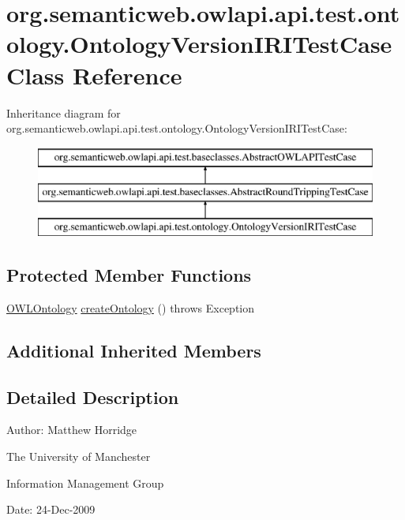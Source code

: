 \hypertarget{classorg_1_1semanticweb_1_1owlapi_1_1api_1_1test_1_1ontology_1_1_ontology_version_i_r_i_test_case}{\section{org.\-semanticweb.\-owlapi.\-api.\-test.\-ontology.\-Ontology\-Version\-I\-R\-I\-Test\-Case Class Reference}
\label{classorg_1_1semanticweb_1_1owlapi_1_1api_1_1test_1_1ontology_1_1_ontology_version_i_r_i_test_case}
}
Inheritance diagram for org.\-semanticweb.\-owlapi.\-api.\-test.\-ontology.\-Ontology\-Version\-I\-R\-I\-Test\-Case\-:\begin{figure}[H]
\begin{center}
\leavevmode
\includegraphics[height=3.000000cm]{classorg_1_1semanticweb_1_1owlapi_1_1api_1_1test_1_1ontology_1_1_ontology_version_i_r_i_test_case}
\end{center}
\end{figure}
\subsection*{Protected Member Functions}
\begin{DoxyCompactItemize}
\item 
\hyperlink{interfaceorg_1_1semanticweb_1_1owlapi_1_1model_1_1_o_w_l_ontology}{O\-W\-L\-Ontology} \hyperlink{classorg_1_1semanticweb_1_1owlapi_1_1api_1_1test_1_1ontology_1_1_ontology_version_i_r_i_test_case_a5d3a3a4dcb2ac44d09301e0f868861c5}{create\-Ontology} ()  throws Exception 
\end{DoxyCompactItemize}
\subsection*{Additional Inherited Members}


\subsection{Detailed Description}
Author\-: Matthew Horridge\par
 The University of Manchester\par
 Information Management Group\par
 Date\-: 24-\/\-Dec-\/2009 

